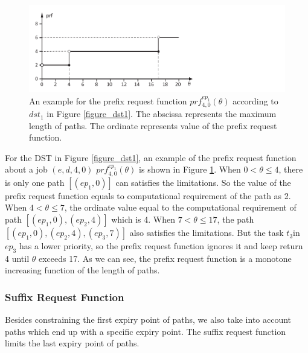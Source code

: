 \documentclass[10pt,conference]{IEEEtran}
\begin{document}

\begin{figure}[t]
  \centering
  \includegraphics[scale=0.51]{graphics/figure_prf-eps-converted-to.pdf}
  \caption{An example for the prefix request function $prf^{ep_1}_{4,0}(\theta)$ according to $dst_1$ in Figure \ref{figure_dst1}. The abscissa represents the maximum length of paths. The ordinate represents value of the prefix request function.} 
  \label{figure_prf}
\end{figure}

For the DST in Figure \ref{figure_dst1}, an example of the prefix request function about a job $(e,d,4,0)$ $prf^{ep_1}_{4,0}(\theta)$ is shown in Figure \ref{figure_prf}. When $0<\theta\leq4$, there is only one path $[(ep_1,0)]$ can satisfies the limitations. So the value of the prefix request function equals to computational requirement of the path as 2. When $4<\theta\leq7$, the ordinate value equal to the computational requirement of path $[(ep_1,0),(ep_2,4)]$ which is 4. When $7<\theta\leq17$, the path $[(ep_1,0),(ep_2,4),(ep_3,7)]$ also satisfies the limitations. But the task $t_3$in $ep_3$ has a lower priority, so the prefix request function ignores it and keep return 4 until $\theta$ exceeds 17. As we can see, the prefix request function is a monotone increasing function of the length of paths.

\subsubsection{Suffix Request Function}
Besides constraining the first expiry point of paths, we also take into account paths which end up with a specific expiry point. The suffix request function limits the last expiry point of paths.
\end{document}
